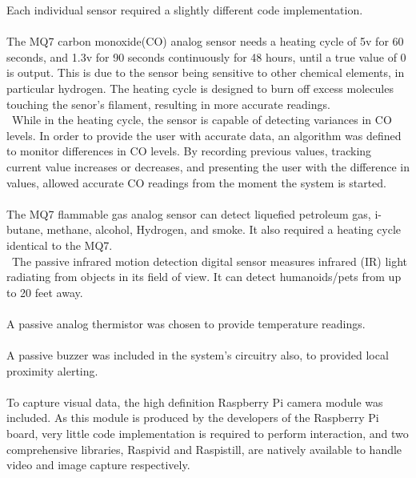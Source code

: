 \documentclass{article}
\begin{document}
Each individual sensor required a slightly different code implementation. \\\\
The MQ7 carbon monoxide(CO) analog sensor needs a heating cycle of 5v for 60 seconds, and 1.3v for 90 seconds continuously for 48 hours, until a true value of 0 is output. This is due to the sensor being sensitive to other chemical elements, in particular hydrogen. The heating cycle is designed to burn off excess molecules touching the senor’s filament, resulting in more accurate readings. \\\ While in the heating cycle, the sensor is capable of detecting variances in CO levels. In order to provide the user with accurate data, an algorithm was defined to monitor differences in CO levels. By recording previous values, tracking current value increases or decreases, and presenting the user with the difference in values, allowed accurate CO readings from the moment the system is started. \\\\
The MQ7 flammable gas analog sensor can detect liquefied petroleum gas, i-butane, methane, alcohol, Hydrogen, and smoke. It also required a heating cycle identical to the MQ7. \\\
The passive infrared motion detection digital sensor measures infrared (IR) light radiating from objects in its field of view. It can detect humanoids/pets from up to 20 feet away. \\\\
A passive analog thermistor was chosen to provide temperature readings. \\\\
A passive buzzer was included in the system’s circuitry also, to provided local proximity alerting. \\\\
To capture visual data, the high definition Raspberry Pi camera module was included. As this module is produced by the developers of the Raspberry Pi board, very little code implementation is required to perform interaction, and two comprehensive libraries, Raspivid and Raspistill,  are natively available to handle video and image capture respectively. \\\\
\end{document}
